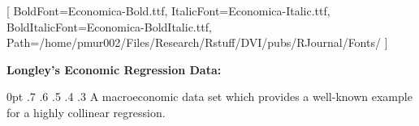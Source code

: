 \setmainfont{Economica-Regular.ttf}[
  BoldFont=Economica-Bold.ttf,
  ItalicFont=Economica-Italic.ttf,
  BoldItalicFont=Economica-BoldItalic.ttf,
  Path=/home/pmur002/Files/Research/Rstuff/DVI/pubs/RJournal/Fonts/ 
]
\fontsize{14}{16}\selectfont
\begin{minipage}{3in}
{\bf Longley's Economic Regression Data:}

0pt .7\textwidth
0pt .6\textwidth
0pt .5\textwidth
0pt .4\textwidth
0pt .3\textwidth
A macroeconomic data set which provides a well-known example for a
highly collinear regression.

\end{minipage}
